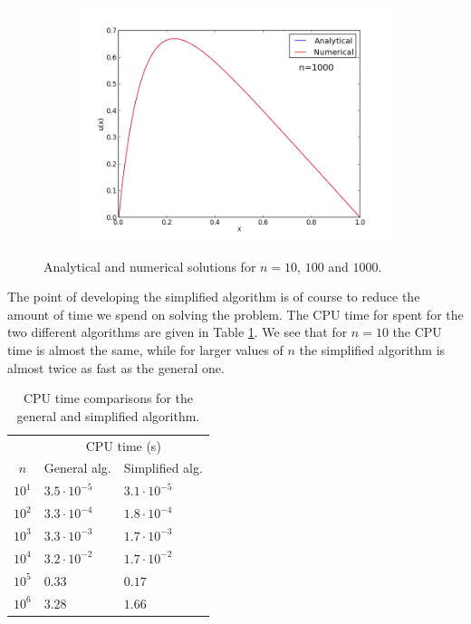\documentclass[12pt, a4paper]{article}
\begin{document}
\begin{figure}[ht!]
\begin{subfigure}[b]{0.495\textwidth}
  \end{subfigure}
  \begin{subfigure}[b]{0.495\textwidth}
        \includegraphics[width=\textwidth]{../Program/plot_n_1000.png}
  \end{subfigure}
  \caption{Analytical and numerical solutions for $n=10$, $100$ and $1000$.} 
  \label{plots}
\end{figure}

The point of developing the simplified algorithm is of course to reduce the amount of time we spend on 
solving the problem. The CPU time for spent for the two different algorithms are given in Table  
\ref{CPU}. We see that for $n=10$ the CPU time is almost the same, while for larger values of $n$ the 
simplified algorithm is almost twice as fast as the general one. 

\begin{table}[ht!]
\begin{center}
\begin{tabular}{c|l|l}
 & \multicolumn{2}{c}{CPU time (s)}  \\
$n$ & General alg. & Simplified alg. \\ \hline 
$10^1$ & $3.5\cdot10^{-5}$ & $3.1\cdot10^{-5}$  \\
$10^2$ & $3.3\cdot10^{-4}$ & $1.8\cdot10^{-4}$\\
$10^3$ & $3.3\cdot10^{-3}$ & $1.7\cdot10^{-3}$ \\
$10^4$ & $3.2\cdot10^{-2}$ & $1.7\cdot10^{-2}$\\
$10^5$ & $0.33$ & $0.17$ \\
$10^6$ & $3.28$ & $1.66$ \\ 
\end{tabular}
\caption{CPU time comparisons for the general and simplified algorithm.}
\label{CPU}
\end{center}
\end{table}
\end{document}
